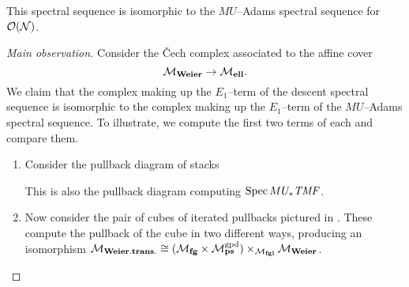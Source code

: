 \begin{lemma}
This spectral sequence is isomorphic to the $MU$--Adams spectral sequence for $\mathcal{O}(\mathcal{N})$.
\end{lemma}
\begin{proof}[Main observation]
Consider the \v{C}ech complex associated to the affine cover \[\mathcal{M}_{\mathbf{Weier}} \to \mathcal{M}_{\mathbf{ell}}.\]  We claim that the complex making up the $E_1$--term of the descent spectral sequence is isomorphic to the complex making up the $E_1$--term of the $MU$--Adams spectral sequence.  To illustrate, we compute the first two terms of each and compare them.
\begin{enumerate}
    \item Consider the pullback diagram of stacks
    \begin{center}
    \end{center}
    This is also the pullback diagram computing $\operatorname{Spec} MU_* \mathit{TMF}$.
    \item Now consider the pair of cubes of iterated pullbacks pictured in .  These compute the pullback of the cube in two different ways, producing an isomorphism $\mathcal{M}_{\mathbf{Weier.trans.}} \cong (\mathcal{M}_{\mathbf{fg}} \times \mathcal{M}_{\mathbf{ps}}^{\mathrm{gpd}}) \times_{\mathcal{M}_{\mathbf{fgl}}} \mathcal{M}_{\mathbf{Weier}}$.
\begin{figure}
    \begin{center}
     \hspace{1em}

\end{center}
\end{figure}
\end{enumerate}
\end{proof}
